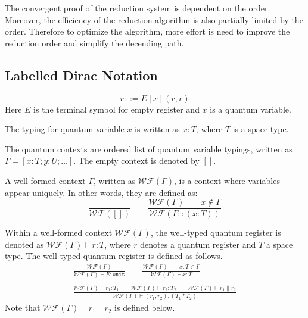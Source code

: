   
The convergent proof of the reduction system is dependent on the order. Moreover, the efficiency of the reduction algorithm is also partially limited by the order. Therefore to optimize the algorithm, more effort is need to improve the reduction order and simplify the decending path.




\subsection{Labelled Dirac Notation}

\begin{definition}
  $$
  r ::= E\ |\ x\ |\ (r, r)
  $$
  Here $E$ is the terminal symbol for empty register and $x$ is a quantum variable.
\end{definition}

\begin{definition}
  The typing for quantum variable $x$ is written as $x : T$, where $T$ is a space type.
\end{definition}

\begin{definition}
  The quantum contexts are ordered list of quantum variable typings, written as $\Gamma = [x : T; y : U; \dots]$. The empty context is denoted by $[]$.
\end{definition}

\begin{definition}
  A well-formed context $\Gamma$, written as $\mathcal{WF}(\Gamma)$, is a context where variables appear uniquely. In other words, they are defined as:
  $$
  \frac{}{\mathcal{WF}([])}
  \qquad
  \frac{\mathcal{WF}(\Gamma)\qquad x \notin \Gamma}{\mathcal{WF}(\Gamma :: (x : T))}
  $$
\end{definition}


\begin{definition}
  Within a well-formed context $\mathcal{WF}(\Gamma)$, the well-typed quantum register is denoted as $\mathcal{WF}(\Gamma) \vdash r : T$, where $r$ denotes a quantum register and $T$ a space type. The well-typed quantum register is defined as follows.
  \begin{gather*}
  \frac{\mathcal{WF}(\Gamma)}{\mathcal{WF}(\Gamma) \vdash E : \texttt{Unit}}
  \qquad
  \frac{\mathcal{WF}(\Gamma)\qquad x:T \in \Gamma}{\mathcal{WF}(\Gamma) \vdash x : T}\\
  \ \\  
  \frac{\mathcal{WF}(\Gamma) \vdash r_1 : T_1 \qquad \mathcal{WF}(\Gamma) \vdash r_2 : T_2\qquad \mathcal{WF}(\Gamma) \vdash r_1 \| r_2}{\mathcal{WF}(\Gamma) \vdash (r_1, r_2) : (T_1 * T_2) }
  \end{gather*}
  Note that $\mathcal{WF}(\Gamma) \vdash r_1 \| r_2$ is defined below.
\end{definition}


